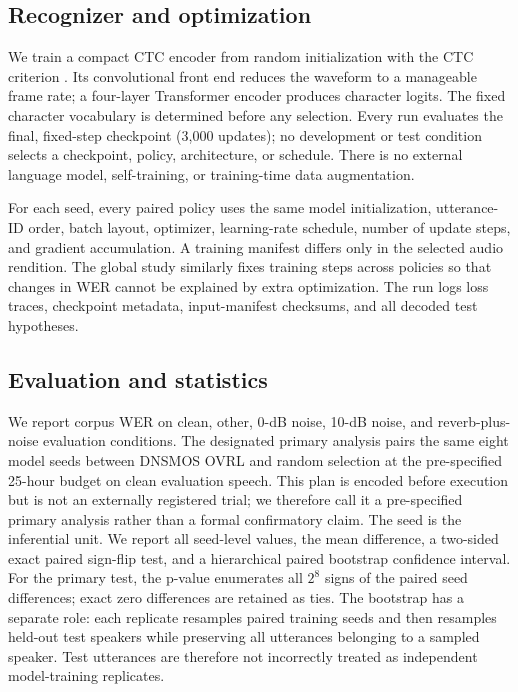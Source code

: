\documentclass[10pt,twocolumn]{article}
\newcommand{\dns}{\textsc{DNSMOS}}
\newcommand{\wer}{\textsc{WER}}
\begin{document}
\subsection{Recognizer and optimization}

We train a compact CTC encoder from random initialization with the CTC criterion \citep{graves2006ctc}. Its convolutional front end reduces the waveform to a manageable frame rate; a four-layer Transformer encoder produces character logits. The fixed character vocabulary is determined before any selection. Every run evaluates the final, fixed-step checkpoint (3,000 updates); no development or test condition selects a checkpoint, policy, architecture, or schedule. There is no external language model, self-training, or training-time data augmentation.

For each seed, every paired policy uses the same model initialization, utterance-ID order, batch layout, optimizer, learning-rate schedule, number of update steps, and gradient accumulation. A training manifest differs only in the selected audio rendition. The global study similarly fixes training steps across policies so that changes in \wer{} cannot be explained by extra optimization. The run logs loss traces, checkpoint metadata, input-manifest checksums, and all decoded test hypotheses.

\subsection{Evaluation and statistics}

We report corpus \wer{} on clean, other, 0-dB noise, 10-dB noise, and reverb-plus-noise evaluation conditions. The designated primary analysis pairs the same eight model seeds between \dns{} OVRL and random selection at the pre-specified 25-hour budget on clean evaluation speech. This plan is encoded before execution but is not an externally registered trial; we therefore call it a pre-specified primary analysis rather than a formal confirmatory claim. The seed is the inferential unit. We report all seed-level values, the mean difference, a two-sided exact paired sign-flip test, and a hierarchical paired bootstrap confidence interval. For the primary test, the p-value enumerates all $2^8$ signs of the paired seed differences; exact zero differences are retained as ties. The bootstrap has a separate role: each replicate resamples paired training seeds and then resamples held-out test speakers while preserving all utterances belonging to a sampled speaker. Test utterances are therefore not incorrectly treated as independent model-training replicates.
\end{document}
